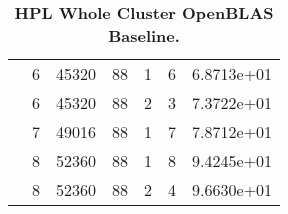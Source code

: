 \begin{table}[H]
\begin{center}
\begin{tabular}{ |l|c|c|c|c|c|c| }
                & 6 & 45320 & 88 & 1 & 6 & 6.8713e+01 \\ 
                & 6 & 45320 & 88 & 2 & 3 & 7.3722e+01 \\ 
                \cline{2-7} 
                & 7 & 49016 & 88 & 1 & 7 & 7.8712e+01 \\ 
                \cline{2-7} 
                & 8 & 52360 & 88 & 1 & 8 & 9.4245e+01 \\ 
                & 8 & 52360 & 88 & 2 & 4 & 9.6630e+01 \\ 
\hline
\end{tabular}
\end{center}
\caption{\label{tab:table-name}\textbf{HPL Whole Cluster OpenBLAS Baseline.}}
\end{table}



